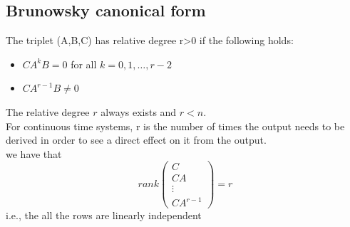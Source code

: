 \documentclass[english]{lectures}
\begin{document}
\subsection{Brunowsky canonical form}
\begin{definition}
    The triplet (A,B,C) has relative degree r>0 if the following holds:
    \begin{itemize}
        \item $CA^kB=0$ for all $k=0,1,\dots,r-2$
        \item $CA^{r-1}B \neq 0$
    \end{itemize}
\end{definition}
The relative degree $r$ always exists and $r<n$.\\
For continuous time systems, r is the number of times the output needs to be derived in order to see a direct effect on it from the output. \\
we have that \[
rank\begin{pmatrix}
    C\\CA\\\vdots\\CA^{r-1}
\end{pmatrix}=r
\]
i.e., the all the rows are linearly independent
\end{document}
